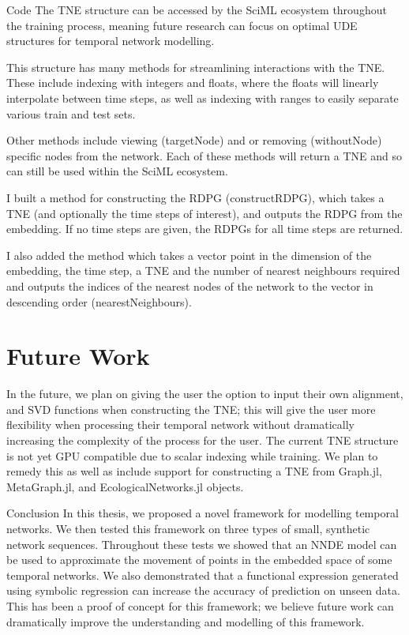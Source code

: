 \documentclass[12pt]{amsbook}
\begin{document}
\begin{chapter}{Code}
        The TNE structure can be accessed by the SciML ecosystem throughout the training process, meaning future research can focus on optimal UDE structures for temporal network modelling.
        
        This structure has many methods for streamlining interactions with the TNE. These include indexing with integers and floats, where the floats will linearly interpolate between time steps, as well as indexing with ranges to easily separate various train and test sets. 

        Other methods include viewing (targetNode) and or removing (withoutNode) specific nodes from the network. Each of these methods will return a TNE and so can still be used within the SciML ecosystem.
        
        I built a method for constructing the RDPG (constructRDPG), which takes a TNE (and optionally the time steps of interest), and outputs the RDPG from the embedding. If no time steps are given, the RDPGs for all time steps are returned. 

        I also added the method which takes a vector point in the dimension of the embedding, the time step, a TNE and the number of nearest neighbours required and outputs the indices of the nearest nodes of the network to the vector in descending order (nearestNeighbours).

    \section{Future Work}
        In the future, we plan on giving the user the option to input their own alignment, and SVD functions when constructing the TNE; this will give the user more flexibility when processing their temporal network without dramatically increasing the complexity of the process for the user. The current TNE structure is not yet GPU compatible due to scalar indexing while training. We plan to remedy this as well as include support for constructing a TNE from Graph.jl, MetaGraph.jl, and EcologicalNetworks.jl objects.

\end{chapter}

\begin{chapter}{Conclusion}
    In this thesis, we proposed a novel framework for modelling temporal networks. We then tested this framework on three types of small, synthetic network sequences. Throughout these tests we showed that an NNDE model can be used to approximate the movement of points in the embedded space of some temporal networks. We also demonstrated that a functional expression generated using symbolic regression can increase the accuracy of prediction on unseen data. This has been a proof of concept for this framework; we believe future work can dramatically improve the understanding and modelling of this framework.
\end{chapter} 


\printbibliography
\end{document}
